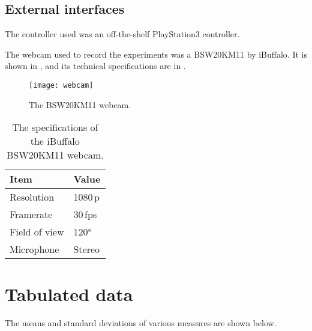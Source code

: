 \section{External interfaces}
The controller used was an off-the-shelf PlayStation3 controller.

The webcam used to record the experiments was a BSW20KM11 by iBuffalo.
It is shown in , and its technical specifications are in .

\begin{figure}[h]
  \centering
  \texttt{[image: webcam]}
  \caption[Webcam]{The BSW20KM11 webcam.}
  \label{fig:webcam}
\end{figure}

\begin{table}[h]
  \centering
  \caption[Webcam specifications]{The specifications of the iBuffalo BSW20KM11 webcam.}
  \begin{tabular}{ll}
    \toprule
    Item & Value \\
    \midrule
    Resolution & 1080\,p\\
    Framerate & 30\,fps\\
    Field of view & 120°\\
    Microphone & Stereo \\
    \bottomrule
  \end{tabular}
  \label{tab:webcam_specs}
\end{table}


\chapter{Tabulated data}
The means and standard deviations of various measures are shown below.

